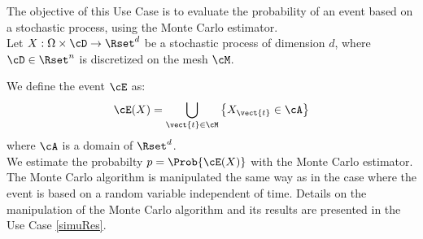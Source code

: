 \renewcommand{\filename}{docUC_StocProc_MonteCarlo.tex}
\renewcommand{\filetitle}{UC : Monte Carlo Probability of an event based on a process}

\HeaderIIILevel

\label{MonteCarloProcess}




The objective of this Use Case is to evaluate the probability of an event based on  a stochastic process, using the Monte Carlo estimator.\\


Let $X: \Omega \times \cD \rightarrow \Rset^d$ be a stochastic process of dimension $d$, where $\cD \in \Rset^n$ is discretized on the mesh $\cM$.

We define the event $\cE$ as:
\begin{align}\label{eventProcStoch}
  \displaystyle \cE(X) = \bigcup_{\vect{t}\in \cM}\left\{X_{\vect{t}}  \in \cA  \right\}
\end{align}
where $\cA$ is a domain of $\Rset^d$. \\

We estimate the probabilty $p=\Prob{\cE(X)}$ with the Monte Carlo estimator.\\

The Monte Carlo algorithm is manipulated the same way as in the case where the event is based on a random variable independent of time. Details on the manipulation of the Monte Carlo algorithm and its results are presented in the Use Case  \ref{simuRes}. \\


